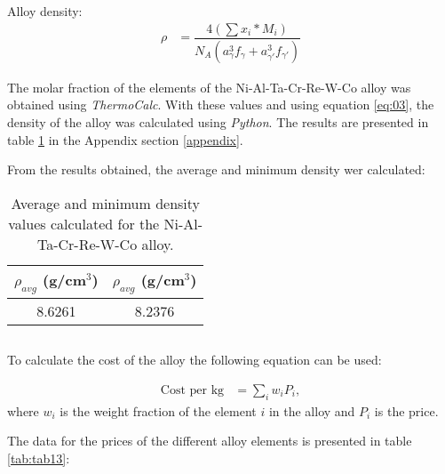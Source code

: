 \clearpage
\section{}

\subsection{}

Alloy density:
\begin{align}
    \label{eq:03}
    \rho &= \dfrac{4(\sum x_i * M_i)}{N_A\left(a_{\gamma}^3f_\gamma+a_{\gamma'}^3f_{\gamma'}\right)}
\end{align}

The molar fraction of the elements of the Ni-Al-Ta-Cr-Re-W-Co alloy was obtained using \textit{ThermoCalc}. With these values and using equation \ref{eq:03}, the density of the alloy was calculated using \textit{Python}. The results are presented in table \ref{tab:tab07} in the Appendix section \ref{appendix}.

From the results obtained, the average and minimum density wer calculated:

\begin{table}[h]
    \centering
    \begin{tabular}{cc}
        $\rho_{avg}$ (g/cm$^3$) & $\rho_{avg}$ (g/cm$^3$) \\ \hline \hline
        8.6261 & 8.2376
    \end{tabular}
    \caption{Average and minimum density values calculated for the Ni-Al-Ta-Cr-Re-W-Co alloy.}
    \label{tab:tab07}
\end{table}

\subsection{}

To calculate the cost of the alloy the following equation can be used:

\begin{align}
    \text{Cost per kg} &= \sum_i w_i P_i,
    \label{eq:04}
\end{align}
where $w_i$ is the weight fraction of the element $i$ in the alloy and $P_i$ is the price.

The data for the prices of the different alloy elements is presented in table \ref{tab:tab13}:

